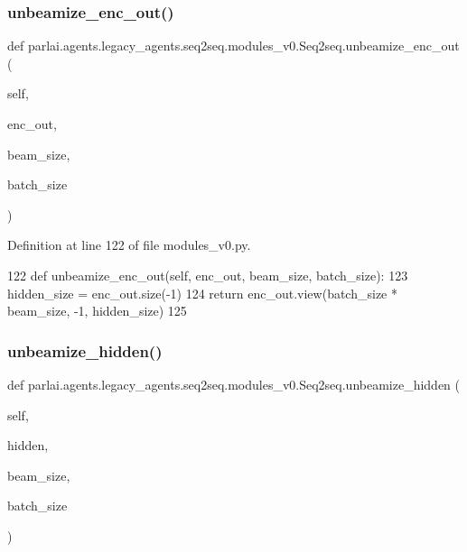 \subsubsection{\texorpdfstring{unbeamize\+\_\+enc\+\_\+out()}{unbeamize\_enc\_out()}}
{\footnotesize\ttfamily def parlai.\+agents.\+legacy\+\_\+agents.\+seq2seq.\+modules\+\_\+v0.\+Seq2seq.\+unbeamize\+\_\+enc\+\_\+out (\begin{DoxyParamCaption}\item[{}]{self,  }\item[{}]{enc\+\_\+out,  }\item[{}]{beam\+\_\+size,  }\item[{}]{batch\+\_\+size }\end{DoxyParamCaption})}



Definition at line 122 of file modules\+\_\+v0.\+py.


\begin{DoxyCode}
122     \textcolor{keyword}{def }unbeamize\_enc\_out(self, enc\_out, beam\_size, batch\_size):
123         hidden\_size = enc\_out.size(-1)
124         \textcolor{keywordflow}{return} enc\_out.view(batch\_size * beam\_size, -1, hidden\_size)
125 
\end{DoxyCode}
\mbox{\label{classparlai_1_1agents_1_1legacy__agents_1_1seq2seq_1_1modules__v0_1_1Seq2seq_adab65a09af78ad2a9bcdca010f0d0fe6}} 
\subsubsection{\texorpdfstring{unbeamize\+\_\+hidden()}{unbeamize\_hidden()}}
{\footnotesize\ttfamily def parlai.\+agents.\+legacy\+\_\+agents.\+seq2seq.\+modules\+\_\+v0.\+Seq2seq.\+unbeamize\+\_\+hidden (\begin{DoxyParamCaption}\item[{}]{self,  }\item[{}]{hidden,  }\item[{}]{beam\+\_\+size,  }\item[{}]{batch\+\_\+size }\end{DoxyParamCaption})}

